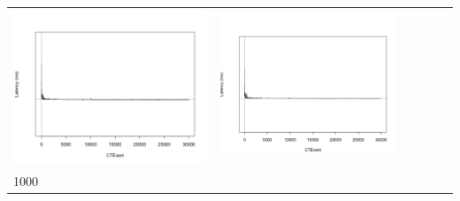 \begin{table}[htbp]
{\begin{tabular}{l | ccccc}
\begin{minipage}{.15\textwidth}
				\vspace{2pt}
     			 	\includegraphics[width=\linewidth]{images/lat-log-graph/N7}
    				 \end{minipage}
    			   &	 \begin{minipage}{.15\textwidth}
     			 	
				\vspace{2pt}
     			 	\includegraphics[width=\linewidth]{images/lat-log-graph/N10}
    				 \end{minipage}\\	
		1000   &	 \begin{minipage}{.15\textwidth}
     			 	

\end{minipage}
\end{tabular}}
\end{table}
